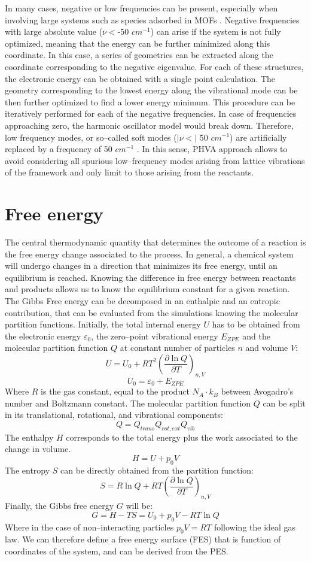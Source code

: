 \npar
In many cases, negative or low frequencies can be present, especially when involving large systems such as species adsorbed in MOFs \cite{DeWispelaere2018}. Negative frequencies with large absolute value ($\nu <$-50 $cm^{-1}$) can arise if the system is not fully optimized, meaning that the energy can be further minimized along this coordinate. In this case, a series of geometries can be extracted along the coordinate corresponding to the negative eigenvalue. For each of these structures, the electronic energy can be obtained with a single point calculation. The geometry corresponding to the lowest energy along the vibrational mode can be then further optimized to find a lower energy minimum. This procedure can be iteratively performed for each of the negative frequencies. In case of frequencies approaching zero, the harmonic oscillator model would break down. Therefore, low frequency modes, or so--called soft modes ($|\nu <|$ 50 $cm^{-1}$) are artificially replaced by a frequency of 50 $cm^{-1}$ \cite{DeWispelaere2018}. In this sense, PHVA approach allows to avoid considering all spurious low--frequency modes arising from lattice vibrations of the framework and only limit to those arising from the reactants.

\section{Free energy}
The central thermodynamic quantity that determines the outcome of a reaction is the free energy change associated to the process. In general, a chemical system will undergo changes in a direction that minimizes its free energy, until an equilibrium is reached. Knowing the difference in free energy between reactants and products allows us to know the equilibrium constant for a given reaction. The Gibbs Free energy can be decomposed in an enthalpic and an entropic contribution, that can be evaluated from the simulations knowing the molecular partition functions. Initially, the total internal energy $U$ has to be obtained from the electronic energy $\varepsilon_0$, the zero--point vibrational energy $E_{ZPE}$ and the molecular partition function $Q$ at constant number of particles $n$ and volume $V$:
\[
U = U_{0} + R T^{2}\left(\frac{\partial \ln Q}{\partial T}\right)_{n,V}
\]
\[ U_{0} = \varepsilon_{0} + E_{ZPE} \]
Where $R$ is the gas constant, equal to the product $N_{A}\cdot k_{B}$ between Avogadro's number and Boltzmann constant. The molecular partition function $Q$ can be split in its translational, rotational, and vibrational components:
\[
Q = Q_{trans}Q_{rot, ext}Q_{vib}
\]
The enthalpy $H$ corresponds to the total energy plus the work associated to the change in volume.
\[
H = U + p_{0}V
\] 
The entropy $S$ can be directly obtained from the partition function:
\[
S = R \ln Q + RT \left(\frac{\partial \ln Q}{\partial
T}\right)_{n,V}
\]
Finally, the Gibbs free energy $G$ will be:
\[
G = H - TS = U_{0} + p_{0}V - RT\ln Q
\]
Where in the case of non--interacting particles $p_{0}V = RT$ following the ideal gas law. We can therefore define a free energy surface (FES) that is function of coordinates of the system, and can be derived from the PES.

